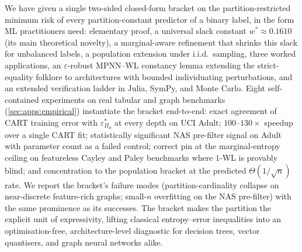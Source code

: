 \documentclass[10pt]{article}
\theoremstyle{definition}
\theoremstyle{remark}
\newcommand{\eps}{\varepsilon}
\begin{document}
We have given a single two-sided closed-form bracket on the
partition-restricted minimum risk of every partition-constant
predictor of a binary label, in the form ML practitioners need:
elementary proof, a universal slack constant
$w^{*} \approx 0.1610$ (its main theoretical novelty), a
marginal-aware refinement that shrinks this slack for
unbalanced labels, a population extension under i.i.d.\
sampling, three worked applications, an $\varepsilon$-robust
MPNN--WL constancy lemma extending the strict-equality
folklore to architectures with bounded individuating
perturbations, and an extended verification ladder in Julia,
SymPy, and Monte Carlo. Eight self-contained experiments on
real tabular and graph benchmarks
(\cref{sec:apps:empirical}) instantiate the bracket end-to-end:
exact agreement of CART training error with
$\eps^{*}_{\Pi_d}$ at every depth on UCI Adult;
$100$--$130\times$ speedup over a single CART fit; statistically
significant NAS pre-filter signal on Adult with parameter count
as a failed control; correct pin at the marginal-entropy
ceiling on featureless Cayley and Paley benchmarks where $1$-WL
is provably blind; and concentration to the population bracket
at the predicted $\Theta(1/\sqrt{n})$ rate. We report the
bracket's failure modes (partition-cardinality collapse on
near-discrete feature-rich graphs; small-$n$ overfitting on the
NAS pre-filter) with the same prominence as its successes. The
bracket makes the partition the explicit unit of expressivity,
lifting classical entropy--error inequalities into an
optimisation-free, architecture-level diagnostic for decision
trees, vector quantisers, and graph neural networks alike.



\end{document}
